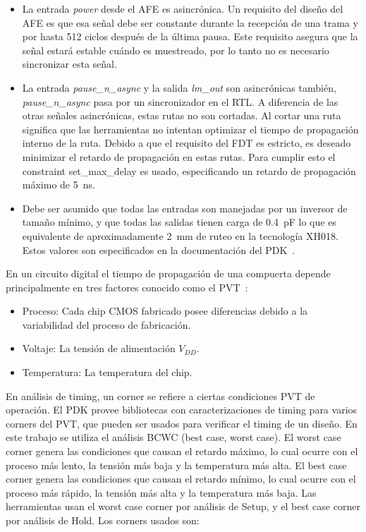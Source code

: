 \documentclass[a4paper, twoside, 11pt]{report}
\begin{document}
\begin{itemize}
  \item La entrada \textit{power} desde el AFE es asincrónica. Un requisito del diseño del AFE es que esa señal debe ser constante durante la recepción de una trama y por hasta 512 ciclos después de la última pausa. Este requisito asegura que la señal estará estable cuándo es muestreado, por lo tanto no es necesario sincronizar esta señal.
  \item La entrada \textit{pause\_n\_async} y la salida \textit{lm\_out} son asincrónicas también, \textit{pause\_n\_async} pasa por un sincronizador en el RTL. A diferencia de las otras señales asincrónicas, estas rutas no son cortadas. Al cortar una ruta significa que las herramientas no intentan optimizar el tiempo de propagación interno de la ruta. Debido a que el requisito del FDT es estricto, es deseado minimizar el retardo de propagación en estas rutas. Para cumplir esto el constraint set\_max\_delay es usado, especificando un retardo de propagación máximo de \SI{5}{\nano\second}.
  \item Debe ser asumido que todas las entradas son manejadas por un inversor de tamaño mínimo, y que todas las salidas tienen carga de \SI{0.4}{\pico\farad} lo que es equivalente de aproximadamente \SI{2}{\milli\meter} de ruteo en la tecnología XH018. Estos valores son especificados en la documentación del PDK~\cite{dig_imp_guidelines}.
\end{itemize}

En un circuito digital el tiempo de propagación de una compuerta depende principalmente en tres factores conocido como el PVT~\cite{sta_for_nm_designs}:

\begin{itemize}
  \item Proceso: Cada chip CMOS fabricado posee diferencias debido a la variabilidad del proceso de fabricación.
  \item Voltaje: La tensión de alimentación $V_{DD}$.
  \item Temperatura: La temperatura del chip.
\end{itemize}

En análisis de timing, un corner se refiere a ciertas condiciones PVT de operación. El PDK provee bibliotecas con caracterizaciones de timing para varios corners del PVT, que pueden ser usados para verificar el timing de un diseño. En este trabajo se utiliza el análisis BCWC (best case, worst case). El worst case corner genera las condiciones que causan el retardo máximo, lo cual ocurre con el proceso más lento, la tensión más baja y la temperatura más alta. El best case corner genera las condiciones que causan el retardo mínimo, lo cual ocurre con el proceso más rápido, la tensión más alta y la temperatura más baja. Las herramientas usan el worst case corner por análisis de Setup, y el best case corner por análisis de Hold. Los corners usados son:
\end{document}
